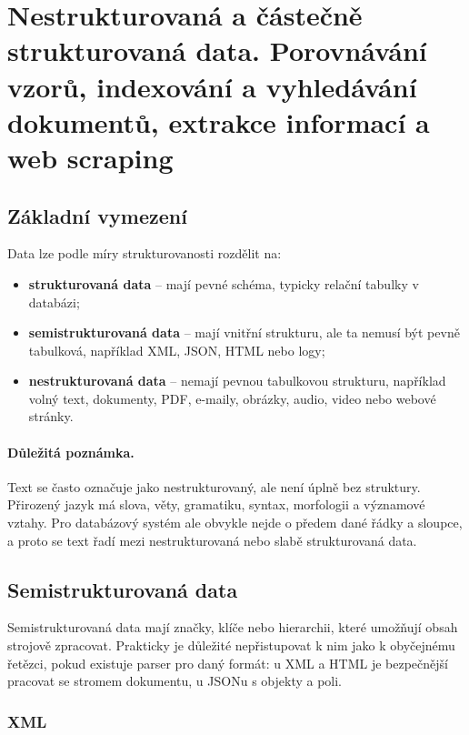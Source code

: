 \section{Nestrukturovaná a částečně strukturovaná data. Porovnávání vzorů, indexování a vyhledávání dokumentů, extrakce informací a web scraping}

\subsection{Základní vymezení}

Data lze podle míry strukturovanosti rozdělit na:
\begin{itemize}
    \item \textbf{strukturovaná data} -- mají pevné schéma, typicky relační tabulky v databázi;
    \item \textbf{semistrukturovaná data} -- mají vnitřní strukturu, ale ta nemusí být pevně tabulková,
    například XML, JSON, HTML nebo logy;
    \item \textbf{nestrukturovaná data} -- nemají pevnou tabulkovou strukturu, například volný text,
    dokumenty, PDF, e-maily, obrázky, audio, video nebo webové stránky.
\end{itemize}

\paragraph{Důležitá poznámka.}
Text se často označuje jako nestrukturovaný, ale není úplně bez struktury. Přirozený jazyk má slova,
věty, gramatiku, syntax, morfologii a významové vztahy. Pro databázový systém ale obvykle nejde o předem
dané řádky a sloupce, a proto se text řadí mezi nestrukturovaná nebo slabě strukturovaná data.

\subsection{Semistrukturovaná data}

Semistrukturovaná data mají značky, klíče nebo hierarchii, které umožňují obsah strojově zpracovat.
Prakticky je důležité nepřistupovat k nim jako k obyčejnému řetězci, pokud existuje parser pro daný formát:
u XML a HTML je bezpečnější pracovat se stromem dokumentu, u JSONu s objekty a poli.

\subsubsection{XML}

